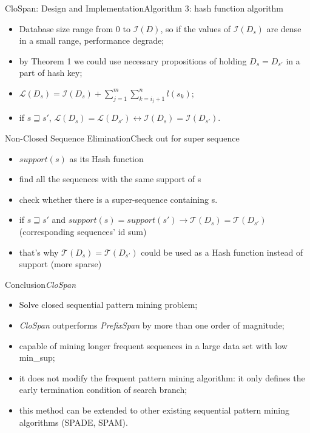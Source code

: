 \documentclass[12pt]{beamer}
\begin{document}
\begin{frame}{CloSpan: Design and Implementation}{Algorithm 3: hash function algorithm}
\begin{itemize}
\item Database size range from 0 to $\mathcal{I}(D)$, so if the values of $\mathcal{I}(D_s)$ are dense in a small range, performance degrade;
\item by Theorem 1 we could use necessary propositions of holding $D_s = D_{s'}$ in a part of hash key;
\item $\mathcal{L}(D_s) = \mathcal{I}(D_s) + \sum^{m}_{j=1} \sum^{n}_{k=i_j+1}l(s_k)$;
\item if $s \sqsupseteq s'$, $\mathcal{L}(D_s) = \mathcal{L}(D_{s'}) \leftrightarrow \mathcal{I}(D_s) = \mathcal{I}(D_{s'})$.
\end{itemize}
\end{frame}

\begin{frame}{Non-Closed Sequence Elimination}{Check out for super sequence}
\begin{itemize}
\item $support(s)$ as its Hash function 
\item find all the sequences with the same support of s
\item check whether there is a super-sequence containing s.
\item if $s \sqsupseteq s'$ and $support(s) = support(s') \rightarrow \mathcal{T}(D_s) = \mathcal{T}(D_{s'})$ (corresponding sequences' id sum)
\item that's why $\mathcal{T}(D_s) = \mathcal{T}(D_{s'})$ could be used as a Hash function instead of support (more sparse)
\end{itemize}
\end{frame}

\begin{frame}{Conclusion}{{\it CloSpan}}
\begin{itemize}
\item Solve closed sequential pattern mining problem;
\item {\it CloSpan} outperforms {\it PrefixSpan} by more than one order of magnitude;
\item capable of mining longer frequent sequences in a large data set with low min\_sup;
\item it does not modify the frequent pattern mining algorithm: it only defines the early termination condition of search branch;
\item this method can be extended to other existing sequential pattern mining algorithms (SPADE, SPAM).
\end{itemize}
\end{frame}
\end{document}
